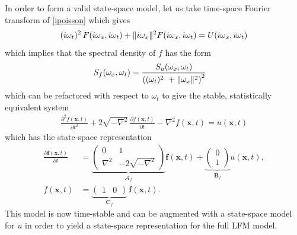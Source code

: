 \documentclass[journal]{IEEEtran}
\begin{document}
In order to form a valid state-space model, let us take time-space Fourier transform of \eqref{ipoisson} which gives
%
\begin{equation}
\begin{split}
  (i \omega_t)^2 \, F(i \boldmath{\omega}_x,i \omega_t)
  + \| i \boldmath{\omega}_x \|^2 F(i \boldmath{\omega}_x,i \omega_t)= U(i \boldmath{\omega}_x,i \omega_t)
\end{split}
\end{equation}
%
%
which implies that the spectral density of $f$ has the form
%
\begin{equation}
\begin{split}
  S_f(\boldmath{\omega}_x,\omega_t)
  &= \frac{S_u(\boldmath{\omega}_x,\omega_t)}{\left( (\omega_t)^2 \ + \| \boldmath{\omega}_x \|^2 \right)^2}
\end{split}
\end{equation}
%
which can be refactored with respect to $\omega_t$ to give the stable, statistically equivalent system
%
\begin{equation}
\begin{split}
  \frac{\partial^2 f(\mathbf{x},t)}{\partial t^2}
  + 2 \sqrt{-\nabla^2} \, \frac{\partial f(\mathbf{x},t)}{\partial t} - \nabla^2 f(\mathbf{x},t) = u(\mathbf{x},t)
\end{split}
\label{spoisson}
\end{equation}
%
which has the state-space representation
%
\begin{equation}
\begin{split}
  \frac{\partial \mathbf{f}(\mathbf{x},t)}{\partial t} &= 
       \underbrace{\begin{pmatrix} 
        0 & 1 \\ 
        \nabla^2
        & -2 \sqrt{-\nabla^2} 
      \end{pmatrix}}_{\mathbf{\mathcal{A}}_f} \mathbf{f}(\mathbf{x},t)
      + \underbrace{\begin{pmatrix} 0 \\ 1 \end{pmatrix}}_{\mathbf{B}_f} u(\mathbf{x},t), \\
      f(\mathbf{x},t) &= \underbrace{\begin{pmatrix} 1 & 0 \end{pmatrix}}_{\mathbf{C}_f} \, \mathbf{f}(\mathbf{x},t).
\end{split}
\end{equation}
%
This model is now time-stable and can be augmented with a state-space model for $u$ in order to yield a state-space representation for the full LFM model.
\end{document}
